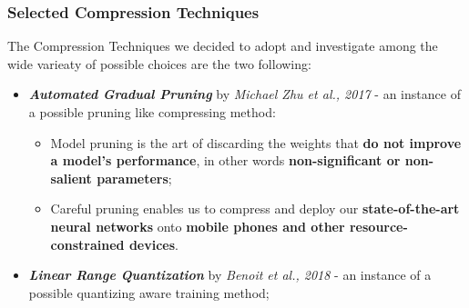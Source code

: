 



\begin{frame}
\frametitle{Selected Compression Techniques}
The Compression Techniques we decided to adopt and investigate among the wide varieaty of possible choices are the two following:
\begin{itemize}
\item \textbf{\textit{Automated Gradual Pruning}} by \textit{Michael Zhu et al., 2017} - an instance of a possible pruning like compressing method:
\begin{itemize}
\item Model pruning is the art of discarding the weights that \textbf{do not improve a model's performance}, in other words \textbf{non-significant or non-salient parameters};
\item Careful pruning enables us to compress and deploy our \textbf{state-of-the-art neural networks} onto \textbf{mobile phones and other resource-constrained devices}.
\end{itemize}
\item \textbf{\textit{Linear Range Quantization}} by \textit{ Benoit et al., 2018} - an instance of a possible quantizing aware training method;
\end{itemize}

\end{frame}
